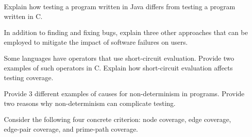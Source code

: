 \documentclass[addpoints]{exam}
\begin{document}
\begin{questions}

	\newpage
%





\question [8] Explain how testing a program written in Java differs from
testing a program written in C.

\question [6] In addition to finding and fixing bugs, explain three other
approaches that can be employed to mitigate the impact of software failures on users.


\question [6] Some languages have operators that use short-circuit evaluation.
Provide two examples of such operators in C. Explain how short-circuit evaluation
affects testing coverage.


\newpage

\question [6] Provide 3 different examples of causes for non-determinism in
programs. Provide two reasons why non-determinism can complicate testing.


\question Consider the following four concrete criterion: node coverage,
edge coverage, edge-pair coverage, and prime-path coverage.

\end{questions}
\end{document}
